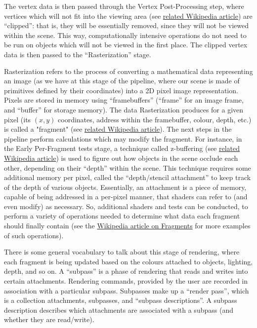 \documentclass[12pt,letterpaper]{article}
\newcommand{\inquotes}[1]{``#1''}	%
\begin{document}
    The vertex data is then passed through the Vertex Post-Processing step, where vertices which will not fit into the viewing area (see \href{https://en.wikipedia.org/wiki/Viewing_frustum}{related Wikipedia article}) are \inquotes{clipped}: that is, they will be essentially removed, since they will not be viewed within the scene. This way, computationally intensive operations do not need to be run on objects which will not be viewed in the first place. The clipped vertex data is then passed to the \inquotes{Rasterization} stage. 

    Rasterization refers to the process of converting a mathematical data representing an image (as we have at this stage of the pipeline, where our scene is made of primitives defined by their coordinates) into a 2D pixel image representation. Pixels are stored in memory using \inquotes{framebuffers} (\inquotes{frame} for an image frame, and \inquotes{buffer} for storage memory). The data Rasterization produces for a given pixel (its $(x, y)$ coordinates, address within the framebuffer, colour, depth, etc.) is called a "fragment" (see \href{https://en.wikipedia.org/wiki/Fragment_(computer_graphics)}{related Wikipedia article}). The next steps in the pipeline perform calculations which may modify the fragment. For instance, in the Early Per-Fragment tests stage, a technique called z-buffering (see \href{https://en.wikipedia.org/wiki/Z-buffering}{related Wikipedia article}) is used to figure out how objects in the scene occlude each other, depending on their \inquotes{depth} within the scene. This technique requires some additional memory per pixel, called the \inquotes{depth/stencil attachment} to keep track of the depth of various objects. Essentially, an attachment is a piece of memory, capable of being addressed in a per-pixel manner, that shaders can refer to (and even modify) as necessary. So, additional shaders and tests can be conducted, to perform a variety of operations needed to determine what data each fragment should finally contain (see the \href{https://en.wikipedia.org/wiki/Fragment_(computer_graphics)}{Wikipedia article on Fragments} for more examples of such operations). 

    There is some general vocabulary to talk about this stage of rendering, where each fragment is being updated based on the colours attached to objects, lighting, depth, and so on. A \inquotes{subpass} is a phase of rendering that reads and writes into certain attachments. Rendering commands, provided by the user are recorded in association with a particular subpass. Subpasses make up a \inquotes{render pass}, which is a collection attachments, subpasses, and \inquotes{subpass descriptions}. A subpass description describes which attachments are associated with a subpass (and whether they are read/write). 
\end{document}
